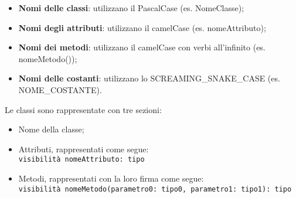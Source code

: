 \begin{itemize}
    \item \textbf{Nomi delle classi}: utilizzano il PascalCase (es. NomeClasse);
    \item \textbf{Nomi degli attributi}: utilizzano il camelCase (es. nomeAttributo);
    \item \textbf{Nomi dei metodi}: utilizzano il camelCase con verbi all'infinito (es. nomeMetodo());
    \item \textbf{Nomi delle costanti}: utilizzano lo SCREAMING\_SNAKE\_CASE (es. NOME\_COSTANTE).
\end{itemize}

Le classi sono rappresentate con tre sezioni:
\begin{itemize}
    \item Nome della classe;
    \item Attributi, rappresentati come segue:\\
    \texttt{visibilità nomeAttributo: tipo}
    \item Metodi, rappresentati con la loro firma come segue:\\
    \texttt{visibilità nomeMetodo(parametro0: tipo0, parametro1: tipo1): tipo}
\end{itemize}

